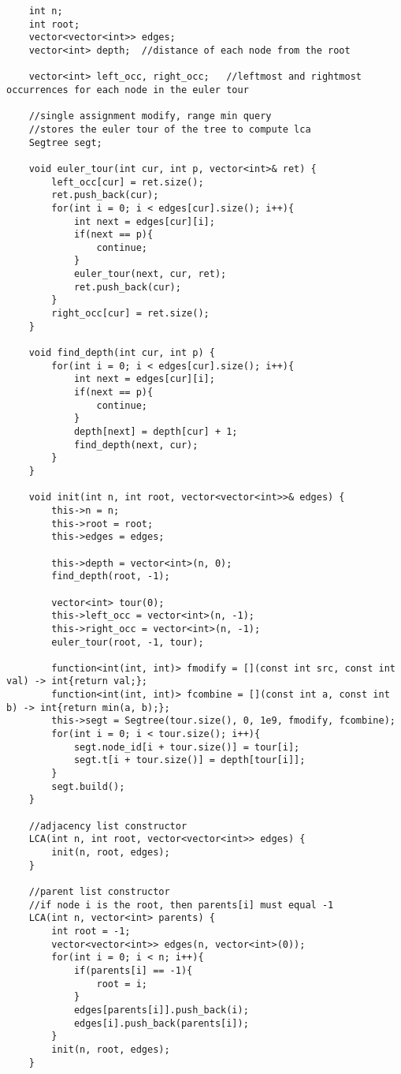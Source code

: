 \documentclass[8pt, headheight=10pt, a4paper]{article}
\begin{document}
\begin{multicols*}{3}
\begin{lstlisting}
    int n;
    int root;
    vector<vector<int>> edges;
    vector<int> depth;  //distance of each node from the root

    vector<int> left_occ, right_occ;   //leftmost and rightmost occurrences for each node in the euler tour
    
    //single assignment modify, range min query
    //stores the euler tour of the tree to compute lca
    Segtree segt;

    void euler_tour(int cur, int p, vector<int>& ret) {
        left_occ[cur] = ret.size();
        ret.push_back(cur);
        for(int i = 0; i < edges[cur].size(); i++){
            int next = edges[cur][i];
            if(next == p){
                continue;
            }
            euler_tour(next, cur, ret);
            ret.push_back(cur);
        }
        right_occ[cur] = ret.size();
    }

    void find_depth(int cur, int p) {
        for(int i = 0; i < edges[cur].size(); i++){
            int next = edges[cur][i];
            if(next == p){
                continue;
            }
            depth[next] = depth[cur] + 1;
            find_depth(next, cur);
        }
    }

    void init(int n, int root, vector<vector<int>>& edges) {
        this->n = n;
        this->root = root;
        this->edges = edges;

        this->depth = vector<int>(n, 0);
        find_depth(root, -1);

        vector<int> tour(0);
        this->left_occ = vector<int>(n, -1);
        this->right_occ = vector<int>(n, -1);
        euler_tour(root, -1, tour);

        function<int(int, int)> fmodify = [](const int src, const int val) -> int{return val;};
        function<int(int, int)> fcombine = [](const int a, const int b) -> int{return min(a, b);};
        this->segt = Segtree(tour.size(), 0, 1e9, fmodify, fcombine);
        for(int i = 0; i < tour.size(); i++){
            segt.node_id[i + tour.size()] = tour[i];
            segt.t[i + tour.size()] = depth[tour[i]];
        }
        segt.build();
    }

    //adjacency list constructor
    LCA(int n, int root, vector<vector<int>> edges) {
        init(n, root, edges);
    }

    //parent list constructor
    //if node i is the root, then parents[i] must equal -1
    LCA(int n, vector<int> parents) {
        int root = -1;
        vector<vector<int>> edges(n, vector<int>(0));
        for(int i = 0; i < n; i++){
            if(parents[i] == -1){
                root = i;
            }
            edges[parents[i]].push_back(i);
            edges[i].push_back(parents[i]);
        }
        init(n, root, edges);
    }


\end{lstlisting}
\end{multicols*}
\end{document}

